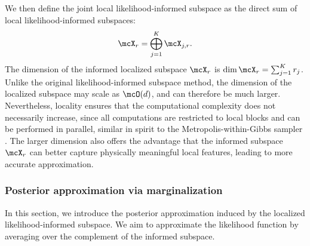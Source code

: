 \documentclass[11pt]{article}
\begin{document}
We then define the joint local likelihood-informed subspace as the direct sum of local likelihood-informed subspaces:
\begin{equation}
\label{eqn:global_LLIS}
    \mcX_r = \bigoplus_{j=1}^K \mcX_{j,r}.
\end{equation}
The dimension of the informed localized subspace $\mcX_r$ is $\dim \mcX_r = \sum_{j=1}^K r_j$.
%
Unlike the original likelihood-informed subspace method, the dimension of the localized subspace may scale as $\mcO(d)$, and can therefore be much larger. Nevertheless, locality ensures that the computational complexity does not necessarily increase, since all computations are restricted to local blocks and can be performed in parallel, similar in spirit to the Metropolis-within-Gibbs sampler \cite{MR4111677,24M1694781}.
%
The larger dimension also offers the advantage that the informed subspace $\mcX_r$ can better capture physically meaningful local features, leading to more accurate approximation.



\subsubsection{Posterior approximation via marginalization}
\label{sec:LLIS_approx}


In this section, we introduce the posterior approximation induced by the localized likelihood-informed subspace.
We aim to approximate the likelihood function by averaging over the complement of the informed subspace.
\end{document}
